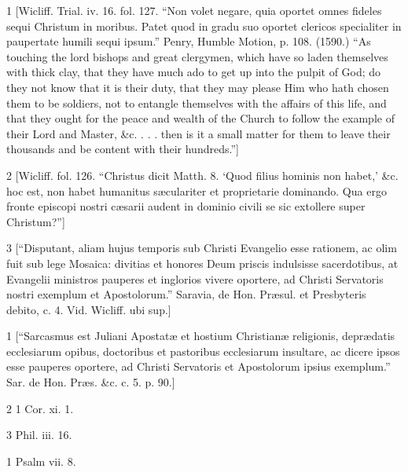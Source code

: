 1
[Wicliff. Trial. iv. 16. fol. 127. “Non volet negare, quia oportet omnes fideles sequi Christum in moribus. Patet quod in gradu suo oportet clericos specialiter in paupertate humili sequi ipsum.” Penry, Humble Motion, p. 108. (1590.) “As touching the lord bishops and great clergymen, which have so laden themselves with thick clay, that they have much ado to get up into the pulpit of God; do they not know that it is their duty, that they may please Him who hath chosen them to be soldiers, not to entangle themselves with the affairs of this life, and that they ought for the peace and wealth of the Church to follow the example of their Lord and Master, &c. . . . then is it a small matter for them to leave their thousands and be content with their hundreds.”]

2
[Wicliff. fol. 126. “Christus dicit Matth. 8. ‘Quod filius hominis non habet,’ &c. hoc est, non habet humanitus sæculariter et proprietarie dominando. Qua ergo fronte episcopi nostri cæsarii audent in dominio civili se sic extollere super Christum?”]

3
[“Disputant, aliam hujus temporis sub Christi Evangelio esse rationem, ac olim fuit sub lege Mosaica: divitias et honores Deum priscis indulsisse sacerdotibus, at Evangelii ministros pauperes et inglorios vivere oportere, ad Christi Servatoris nostri exemplum et Apostolorum.” Saravia, de Hon. Præsul. et Presbyteris debito, c. 4. Vid. Wicliff. ubi sup.]

1
[“Sarcasmus est Juliani Apostatæ et hostium Christianæ religionis, deprædatis ecclesiarum opibus, doctoribus et pastoribus ecclesiarum insultare, ac dicere ipsos esse pauperes oportere, ad Christi Servatoris et Apostolorum ipsius exemplum.” Sar. de Hon. Præs. &c. c. 5. p. 90.]

2
1 Cor. xi. 1.

3
Phil. iii. 16.

1
Psalm vii. 8.

